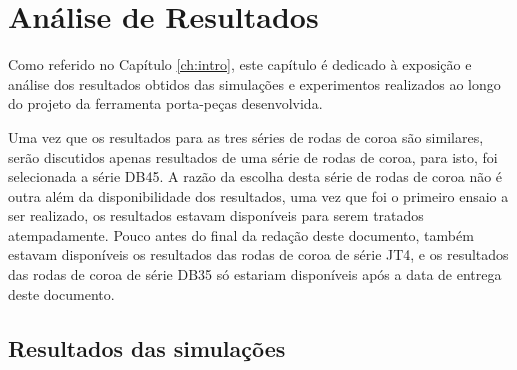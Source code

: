 \chapter{Análise de Resultados} \label{ch:resultados}
\setlength{\headheight}{13.6pt}
Como referido no Capítulo \ref{ch:intro}, este capítulo é dedicado à exposição e análise dos resultados obtidos das simulações e experimentos realizados ao longo do projeto da ferramenta porta-peças desenvolvida.
\par
Uma vez que os resultados para as tres séries de rodas de coroa são similares, serão discutidos apenas resultados de uma série de rodas de coroa, para isto, foi selecionada a série DB45. A razão da escolha desta série de rodas de coroa não é outra além da disponibilidade dos resultados, uma vez que foi o primeiro ensaio a ser realizado, os resultados estavam disponíveis para serem tratados atempadamente. Pouco antes do final da redação deste documento, também estavam disponíveis os resultados das rodas de coroa de série JT4, e os resultados das rodas de coroa de série DB35 só estariam disponíveis após a data de entrega deste documento.
\section{Resultados das simulações} \label{ch:resultados_simulacoes}

